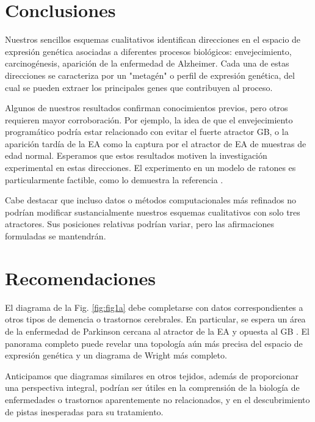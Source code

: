 \chapter*{Conclusiones}\label{conclutions}
\onehalfspacing

Nuestros sencillos esquemas cualitativos identifican direcciones en el espacio de expresión genética asociadas a diferentes procesos biológicos: envejecimiento, carcinogénesis, aparición de la enfermedad de Alzheimer. Cada una de estas direcciones se caracteriza por un "metagén" o perfil de expresión genética, del cual se pueden extraer los principales genes que contribuyen al proceso.

Algunos de nuestros resultados confirman conocimientos previos, pero otros requieren mayor corroboración. Por ejemplo, la idea de que el envejecimiento programático podría estar relacionado con evitar el fuerte atractor GB, o la aparición tardía de la EA como la captura por el atractor de EA de muestras de edad normal. Esperamos que estos resultados motiven la investigación experimental en estas direcciones. El experimento en un modelo de ratones es particularmente factible, como lo demuestra la referencia \cite{hahn2023atlas}.

Cabe destacar que incluso datos o métodos computacionales más refinados no podrían modificar sustancialmente nuestros esquemas cualitativos con solo tres atractores. Sus posiciones relativas podrían variar, pero las afirmaciones formuladas se mantendrán.


\chapter*{Recomendaciones}\label{recomendations}



El diagrama de la Fig. \ref{fig:fig1a} debe completarse con datos correspondientes a otros tipos de demencia o trastornos cerebrales. En particular, se espera un área de la enfermedad de Parkinson cercana al atractor de la EA y opuesta al GB \cite{Mencke_2020}. El panorama completo puede revelar una topología aún más precisa del espacio de expresión genética y un diagrama de Wright más completo.

Anticipamos que diagramas similares en otros tejidos, además de proporcionar una perspectiva integral, podrían ser útiles en la comprensión de la biología de enfermedades o trastornos aparentemente no relacionados, y en el descubrimiento de pistas inesperadas para su tratamiento.

